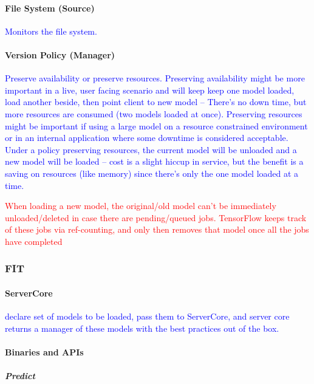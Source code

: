 \paragraph{File System (Source)}

\textcolor{blue}{Monitors the file system.}


\paragraph{Version Policy (Manager)}

\textcolor{blue}{Preserve availability or preserve resources. Preserving availability might be more important in a live, user facing scenario and will keep keep one model loaded, load another beside, then point client to new model -- There's no down time, but more resources are consumed (two models loaded at once).  Preserving resources might be important if using a large model on a resource constrained environment or in an internal application where some downtime is considered acceptable. Under a policy preserving resources, the current model will be unloaded and a new model will be loaded -- cost is a slight hiccup in service, but the benefit is a saving on resources (like memory) since there's only the one model loaded at a time.}

\textcolor{red}{When loading a new model, the original/old model can't be immediately unloaded/deleted in case there are pending/queued jobs. TensorFlow keeps track of these jobs via ref-counting, and only then removes that model once all the jobs have completed}


\subsubsection{FIT}

\paragraph{ServerCore}

\textcolor{blue}{declare set of models to be loaded, pass them to ServerCore, and server core returns a manager of these models with the best practices out of the box.}


\paragraph{Binaries and APIs}

\subparagraph{Predict}

